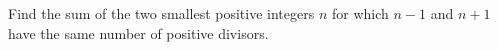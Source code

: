 Find the sum of the two smallest positive integers $n$ for which $n-1$ and $n+1$ have the same number of positive divisors.
